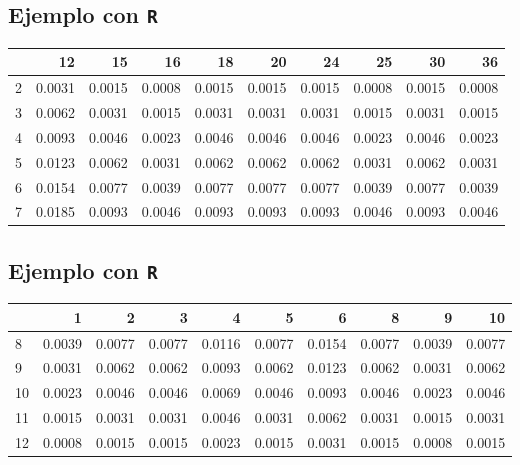 \documentclass[]{book}
\begin{document}
\hypertarget{ejemplo-con-r-2}{%
\subsection{\texorpdfstring{Ejemplo con \texttt{R}}{Ejemplo con R}}\label{ejemplo-con-r-2}}

\begin{tabular}{l|r|r|r|r|r|r|r|r|r}
\hline
  & 12 & 15 & 16 & 18 & 20 & 24 & 25 & 30 & 36\\
\hline
2 & 0.0031 & 0.0015 & 0.0008 & 0.0015 & 0.0015 & 0.0015 & 0.0008 & 0.0015 & 0.0008\\
\hline
3 & 0.0062 & 0.0031 & 0.0015 & 0.0031 & 0.0031 & 0.0031 & 0.0015 & 0.0031 & 0.0015\\
\hline
4 & 0.0093 & 0.0046 & 0.0023 & 0.0046 & 0.0046 & 0.0046 & 0.0023 & 0.0046 & 0.0023\\
\hline
5 & 0.0123 & 0.0062 & 0.0031 & 0.0062 & 0.0062 & 0.0062 & 0.0031 & 0.0062 & 0.0031\\
\hline
6 & 0.0154 & 0.0077 & 0.0039 & 0.0077 & 0.0077 & 0.0077 & 0.0039 & 0.0077 & 0.0039\\
\hline
7 & 0.0185 & 0.0093 & 0.0046 & 0.0093 & 0.0093 & 0.0093 & 0.0046 & 0.0093 & 0.0046\\
\hline
\end{tabular}

\hypertarget{ejemplo-con-r-3}{%
\subsection{\texorpdfstring{Ejemplo con \texttt{R}}{Ejemplo con R}}\label{ejemplo-con-r-3}}

\begin{tabular}{l|r|r|r|r|r|r|r|r|r}
\hline
  & 1 & 2 & 3 & 4 & 5 & 6 & 8 & 9 & 10\\
\hline
8 & 0.0039 & 0.0077 & 0.0077 & 0.0116 & 0.0077 & 0.0154 & 0.0077 & 0.0039 & 0.0077\\
\hline
9 & 0.0031 & 0.0062 & 0.0062 & 0.0093 & 0.0062 & 0.0123 & 0.0062 & 0.0031 & 0.0062\\
\hline
10 & 0.0023 & 0.0046 & 0.0046 & 0.0069 & 0.0046 & 0.0093 & 0.0046 & 0.0023 & 0.0046\\
\hline
11 & 0.0015 & 0.0031 & 0.0031 & 0.0046 & 0.0031 & 0.0062 & 0.0031 & 0.0015 & 0.0031\\
\hline
12 & 0.0008 & 0.0015 & 0.0015 & 0.0023 & 0.0015 & 0.0031 & 0.0015 & 0.0008 & 0.0015\\
\hline
\end{tabular}
\end{document}
